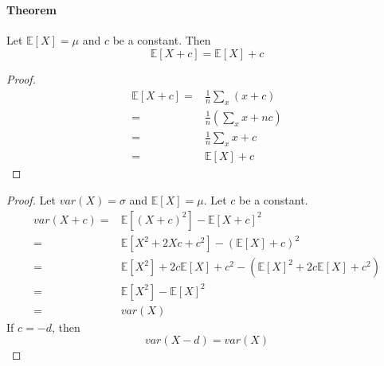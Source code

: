 \documentclass{article}
\begin{document}
    \section{}
        \subsection{}
            \subsubsection{}
                \paragraph{Theorem}
                Let $\mathbb{E}[X]=\mu$ and $c$ be a constant. Then
                $$\mathbb{E}[X+c]=\mathbb{E}[X]+c$$
                \begin{proof}
                    \begin{align*}
                        \mathbb{E}[X+c]=&\frac{1}{n}\sum_{x}(x+c)\\
                            =&\frac{1}{n}(\sum_x x+nc)\\
                            =&\frac{1}{n}\sum_x x+c\\
                            =&\mathbb{E}[X]+c
                    \end{align*}
                \end{proof}
                \begin{proof}
                    Let $var(X)=\sigma$ and $\mathbb{E}[X]=\mu$. Let $c$ be a constant.
                    \begin{align*}
                        var(X+c)=&\mathbb{E}[(X+c)^2]-\mathbb{E}[X+c]^2\\
                            =&\mathbb{E}[X^2+2Xc+c^2]-(\mathbb{E}[X]+c)^2\\
                            =&\mathbb{E}[X^2]+2c\mathbb{E}[X]+c^2-(\mathbb{E}[X]^2+2c\mathbb{E}[X]+c^2)\\
                            =&\mathbb{E}[X^2]-\mathbb{E}[X]^2\\
                            =&var(X)
                    \end{align*}
                    If $c=-d$, then
                    $$var(X-d)=var(X)$$
                \end{proof}
            \subsubsection{}
\end{document}
